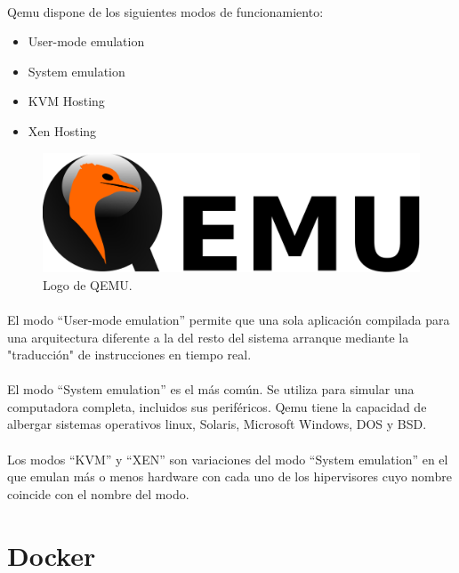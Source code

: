 \paragraph{}Qemu dispone de los siguientes modos de funcionamiento:

\begin{itemize}
	\item User-mode emulation
	\item System emulation
	\item \gls{KVM} Hosting
	\item Xen Hosting
\end{itemize}

\begin{figure}[h]
	\centering
	\includegraphics[width=0.50\linewidth]{imgs/qemu-logo}
	\caption[Qemu Logo]{Logo de QEMU.}
	\label{fig:qemu}
\end{figure}

\paragraph{} El modo ``User-mode emulation'' permite que una sola aplicación compilada
para una arquitectura diferente a la del resto del sistema arranque mediante la "traducción"
de instrucciones en tiempo real.

\paragraph{} El modo ``System emulation'' es el más común. Se utiliza para simular una computadora
completa, incluidos sus periféricos. Qemu tiene la capacidad de albergar sistemas operativos
linux, Solaris, Microsoft Windows, DOS y BSD.

\paragraph{} Los modos ``\gls{KVM}'' y ``\gls{XEN}'' son variaciones del modo ``System emulation'' en el
que emulan más o menos hardware con cada uno de los hipervisores cuyo nombre coincide con
el nombre del modo.

\section{Docker}\label{sec:docker}

